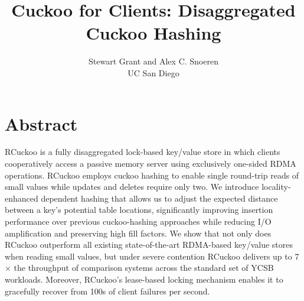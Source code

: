 \documentclass[10pt,twocolumn]{article}
\begin{document}
\title{Cuckoo for Clients: Disaggregated Cuckoo Hashing}
\author{Stewart Grant and Alex C. Snoeren\\ UC San Diego}
\date{}

\maketitle

\section*{Abstract}


RCuckoo is a fully disaggregated lock-based key/value store in which
clients cooperatively access a passive memory server using exclusively
one-sided RDMA operations.  RCuckoo employs cuckoo hashing to enable
single round-trip reads of small values while updates and deletes
require only two.  We introduce locality-enhanced dependent hashing
that allows us to adjust the expected distance between a key's
potential table locations, 
significantly improving insertion performance over previous cuckoo-hashing
approaches while reducing I/O amplification and preserving high fill factors.
We show that not only does RCuckoo outperform all existing
state-of-the-art RDMA-based key/value stores when reading small values, but under
severe contention RCuckoo delivers up to 7$\times$ the throughput
of comparison systems across the standard set of YCSB workloads.  Moreover,
RCuckoo's lease-based locking mechanism enables it to gracefully
recover from 100s of client failures per second.

\end{document}
